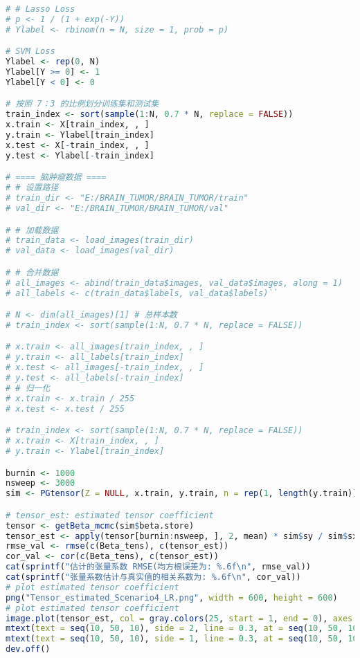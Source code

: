 \documentclass[AutoFakeBold]{LZUThesis}
\begin{document}
\begin{lstlisting}[language = R, caption = {BT-LR}算法]
# # Lasso Loss
# p <- 1 / (1 + exp(-Y))
# Ylabel <- rbinom(n = N, size = 1, prob = p)

# SVM Loss
Ylabel <- rep(0, N)
Ylabel[Y >= 0] <- 1
Ylabel[Y < 0] <- 0

# 按照 7：3 的比例划分训练集和测试集
train_index <- sort(sample(1:N, 0.7 * N, replace = FALSE))
x.train <- X[train_index, , ]
y.train <- Ylabel[train_index]
x.test <- X[-train_index, , ]
y.test <- Ylabel[-train_index]

# ==== 脑肿瘤数据 ====
# # 设置路径
# train_dir <- "E:/BRAIN_TUMOR/BRAIN_TUMOR/train"
# val_dir <- "E:/BRAIN_TUMOR/BRAIN_TUMOR/val"

# # 加载数据
# train_data <- load_images(train_dir)
# val_data <- load_images(val_dir)

# # 合并数据
# all_images <- abind(train_data$images, val_data$images, along = 1)
# all_labels <- c(train_data$labels, val_data$labels)``

# N <- dim(all_images)[1] # 总样本数
# train_index <- sort(sample(1:N, 0.7 * N, replace = FALSE))

# x.train <- all_images[train_index, , ]
# y.train <- all_labels[train_index]
# x.test <- all_images[-train_index, , ]
# y.test <- all_labels[-train_index]
# # 归一化
# x.train <- x.train / 255
# x.test <- x.test / 255

# train_index <- sort(sample(1:N, 0.7 * N, replace = FALSE))
# x.train <- X[train_index, , ]
# y.train <- Ylabel[train_index]

burnin <- 1000
nsweep <- 3000
sim <- PGtensor(Z = NULL, x.train, y.train, n = rep(1, length(y.train)), nsweep = nsweep, rank = 3, scale = T)

# tensor_est: estimated tensor coefficient
tensor <- getBeta_mcmc(sim$beta.store)
tensor_est <- apply(tensor[burnin:nsweep, ], 2, mean) * sim$sy / sim$sx
rmse_val <- rmse(c(Beta_tens), c(tensor_est))
cor_val <- cor(c(Beta_tens), c(tensor_est))
cat(sprintf("估计的张量系数 RMSE(均方根误差为: %.6f\n", rmse_val))
cat(sprintf("张量系数估计与真实值的相关系数为: %.6f\n", cor_val))
# plot estimated tensor coefficient
png("Tensor_estimated_Scenario4_LR.png", width = 600, height = 600)
# plot estimated tensor coefficient
image.plot(tensor_est, col = gray.colors(25, start = 1, end = 0), axes = F)
mtext(text = seq(10, 50, 10), side = 2, line = 0.3, at = seq(10, 50, 10) / 48, las = 1, cex = 0.8)
mtext(text = seq(10, 50, 10), side = 1, line = 0.3, at = seq(10, 50, 10) / 48, las = 2, cex = 0.8)
dev.off()


\end{lstlisting}
\end{document}
